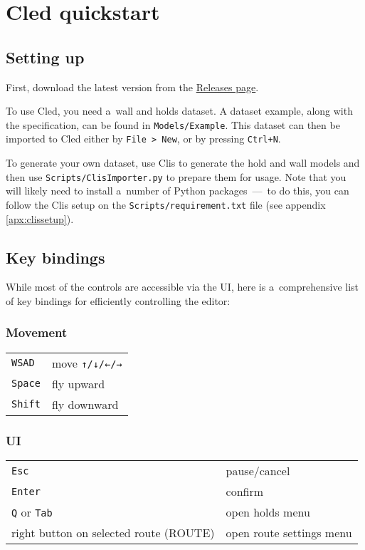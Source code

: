 \chapter{Cled quickstart}\label{apx:cled}

\section{Setting up}
First, download the latest version from the \href{https://github.com/Climber-Tools/Cled/releases}{Releases page}.

To use Cled, you need a~wall and holds dataset.
A dataset example, along with the specification, can be found in \verb|Models/Example|.
This dataset can then be imported to Cled either by \verb|File > New|, or by pressing
\verb|Ctrl+N|.

To generate your own dataset, use Clis \cite{clis} to generate the hold and wall models and then use \verb|Scripts/ClisImporter.py| to prepare them for usage.
Note that you will likely need to install a~number of Python packages~---~to do this, you can follow the Clis setup on the \verb|Scripts/requirement.txt| file (see appendix \ref{apx:clissetup}).

\section{Key bindings}

While most of the controls are accessible via the UI, here is a~comprehensive list of key bindings for efficiently controlling the editor:

\subsection{Movement}

\begin{tabular}[]{@{}ll@{}}
\toprule
\verb|WSAD| & move \verb|↑/↓/←/→| \\
\verb|Space| & fly upward \\
\verb|Shift| & fly downward \\
\bottomrule
\end{tabular}

\subsection{UI}

\begin{tabular}[]{@{}ll@{}}
\toprule
\verb|Esc| & pause/cancel \\
\verb|Enter| & confirm \\
\verb|Q| or \verb|Tab| & open holds menu \\
right button on selected route (ROUTE) & open route settings menu \\
\bottomrule
\end{tabular}

